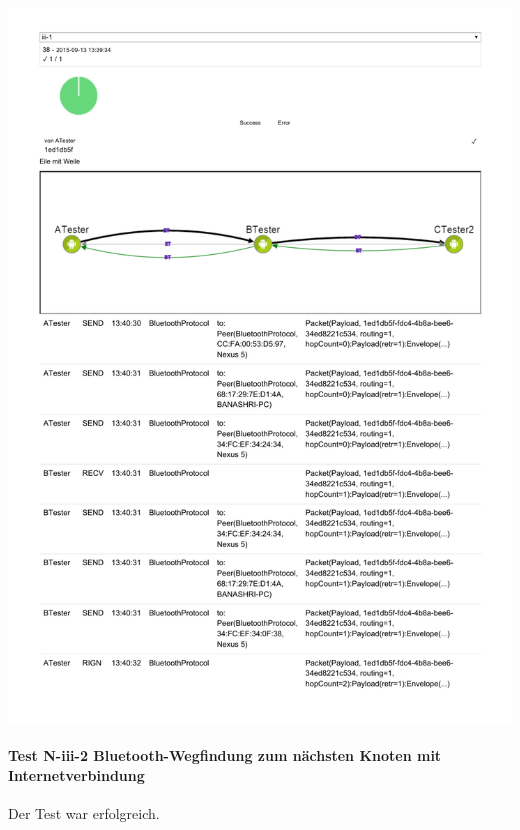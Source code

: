 \includegraphics[trim=0 200 0 0,clip,scale=0.8]{belege/manuelle-tests/netzwerk/Dashboardauszuege/Netzwerktest_n-iii-1.pdf}
\clearpage

\paragraph{Test N-iii-2 Bluetooth-Wegfindung zum nächsten Knoten mit Internetverbindung}

Der Test war erfolgreich.

